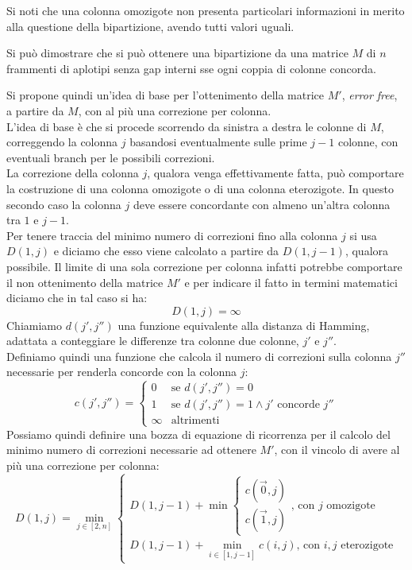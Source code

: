 \documentclass[a4paper,12pt, oneside]{book}
\begin{document}
\noindent
Si noti che una colonna omozigote non presenta particolari informazioni in
merito alla questione della bipartizione, avendo tutti valori uguali.
\begin{teorema}
  Si può dimostrare che si può ottenere una bipartizione da una matrice $M$
  di $n$ frammenti di aplotipi senza gap interni sse ogni coppia di
  colonne concorda.
\end{teorema}
\noindent
Si propone quindi un'idea di base per l'ottenimento della matrice $M'$,
\textit{error free}, a partire da $M$, con al più una correzione per colonna.\\
L'idea di base è che si procede scorrendo da sinistra a destra le colonne di
$M$, correggendo la colonna $j$ basandosi eventualmente sulle prime $j-1$
colonne, con eventuali branch per le possibili correzioni.\\
La correzione della colonna $j$, qualora venga effettivamente fatta, può
comportare la costruzione di una colonna omozigote o di una colonna
eterozigote. In questo secondo caso la colonna $j$ deve essere concordante con
almeno un'altra colonna tra $1$ e $j-1$.\\
Per tenere traccia del minimo numero di correzioni fino alla colonna $j$ si usa
$D(1,j)$ e diciamo che esso viene calcolato a partire da $D(1,j-1)$, qualora
possibile. Il limite di una sola correzione per colonna infatti potrebbe
comportare il non ottenimento della matrice $M'$ e per indicare il fatto in
termini matematici diciamo che in tal caso si ha:
\[D(1,j)=\infty\]
Chiamiamo $d(j',j'')$ una funzione equivalente alla distanza di Hamming,
adattata a conteggiare le differenze tra colonne due colonne, $j'$ e $j''$.\\
Definiamo quindi una funzione che calcola il numero di correzioni sulla colonna
$j''$ necessarie per renderla concorde con la colonna $j$:
\[c(j',j'')=
  \begin{cases}
    0&\mbox{se } d(j',j'')=0\\
    1&\mbox{se } d(j',j'')=1 \land j'\mbox{ concorde } j''\\
    \infty&\mbox{altrimenti}
  \end{cases}
\]
Possiamo quindi definire una bozza di equazione di ricorrenza per il calcolo del
minimo numero di correzioni necessarie ad ottenere $M'$, con il vincolo di avere
al più una correzione per colonna:
\[D(1,j)=\min_{j\in[2,n]}
  \begin{cases}
    D(1,j-1)+\min
    \begin{cases}
      c(\vec{0},j)\\
      c(\vec{1},j)
    \end{cases}
    \mbox{, con $j$ omozigote}\\
    D(1,j-1)+\min_{i\in[1,j-1]}c(i,j)\mbox{, con $i,j$ eterozigote}
  \end{cases}
\]
\end{document}
